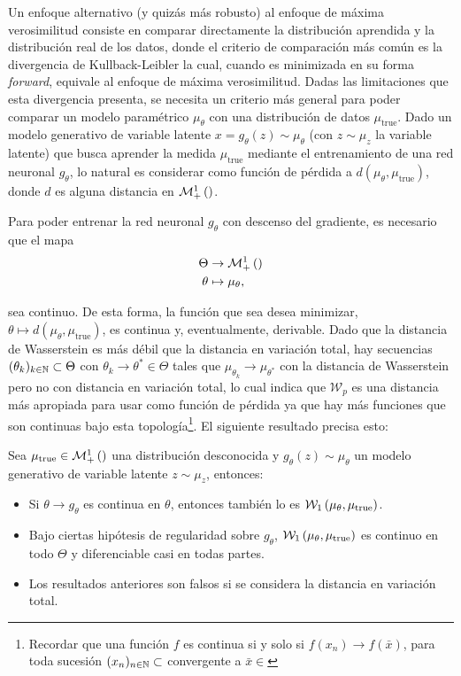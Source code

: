 Un enfoque alternativo (y quizás más robusto) al enfoque de máxima verosimilitud consiste en comparar directamente la distribución aprendida y la distribución real de los datos, donde el criterio de comparación más común es la divergencia de Kullback-Leibler la cual, cuando es minimizada en su forma \textit{forward}, equivale al enfoque de máxima verosimilitud. Dadas las limitaciones que esta divergencia presenta, se necesita un criterio más general para poder comparar un modelo paramétrico $\mu_\theta$ con una distribución de datos $\mu_{\text{true}}$. Dado un modelo generativo de variable latente $x=g_\theta(z)\sim\mu_\theta$ (con $z\sim\mu_z$ la variable latente) que busca aprender la medida $\mu_{\text{true}}$ mediante el entrenamiento de una red neuronal $g_\theta$, lo natural es considerar como función de pérdida a $d(\mu_\theta,\mu_{\text{true}})$, donde $d$ es alguna distancia en $\mathcal{M}_+^1\left(\right)$.

Para poder entrenar la red neuronal $g_\theta$ con descenso del gradiente, es necesario que el mapa
\begin{align*}
	\Theta&\to \mathcal{M}_+^1\left(\right)\\
	\theta&\mapsto \mu_\theta ,
\end{align*}

sea continuo. De esta forma, la función que sea desea minimizar, $\theta\mapsto d(\mu_\theta,\mu_{\text{true}})$, es continua y, eventualmente, derivable. Dado que la distancia de Wasserstein es más débil que la distancia en variación total, hay secuencias $(\theta_k)_{k\in\mathbb{N}}\subset\Theta$ con $\theta_k\to\theta^*\in\Theta$ tales que $\mu_{\theta_k}\to\mu_{\theta^*}$ con la distancia de Wasserstein pero no con distancia en variación total, lo cual indica que $\mathcal{W}_p$ es una distancia más apropiada para usar como función de pérdida ya que hay más funciones que son continuas bajo esta topología\footnote{Recordar que una función $f$ es continua si y solo si $f(x_n)\to f(\bar x)$, para toda sucesión $(x_n)_{n\in\mathbb{N}}\subset$ convergente a $\bar x\in\xspace$}. El siguiente resultado precisa esto:

\begin{teo}
	Sea $\mu_{\text{true}}\in\mathcal{M}_+^1\left(\right)$ una distribución desconocida y $g_\theta(z)\sim\mu_\theta$ un modelo generativo de variable latente $z\sim\mu_z$, entonces:

	\begin{itemize}
		\item Si $\theta\to g_\theta$ es continua en $\theta$, entonces también lo es $\mathcal{W}_{1}\left(\mu_\theta,\mu_{\text{true}}\right)$.
		\item Bajo ciertas hipótesis de regularidad sobre $g_\theta$, $\mathcal{W}_{1}\left(\mu_\theta,\mu_{\text{true}}\right)$ es continuo en todo $\Theta$ y diferenciable casi en todas partes.
		\item Los resultados anteriores son falsos si se considera la distancia en variación total.
	\end{itemize}
\end{teo}


